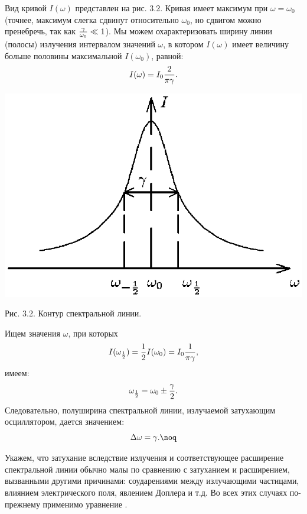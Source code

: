 Вид кривой $I(\omega)$ представлен на рис. 3.2. Кривая имеет
максимум при $\omega=\omega_0$ (точнее, максимум слегка сдвинут
относительно $\omega_0$, но сдвигом можно пренебречь, так как
${\gamma\over \omega_0}\ll 1$). Мы можем охарактеризовать ширину
линии (полосы) излучения интервалом значений $\omega$, в котором
$I(\omega)$ имеет величину больше половины максимальной
$I(\omega_0)$, равной: \vskip -2mm
$$I(\omega)=I_0{2\over\pi\gamma}.$$

\vskip 3mm
\centerline{\hbox{\includegraphics[scale=0.7]{Ris/ris_eps/ris3_02.eps}}}

\vskip -2mm
\leftskip 0cm\centerline{\ris Рис. 3.2. Контур спектральной
линии.} \vskip 2mm Ищем значения $\omega$, при которых
$$I(\omega_{1\over2})={1\over2}I(\omega_0)=I_0{1\over\pi\gamma},$$
имеем:
$$\omega_{1\over2}=\omega_0\pm{\gamma\over2}.$$
Следовательно, полуширина спектральной линии, излучаемой
затухающим осциллятором, дается значением:
$$\Delta \omega=\gamma.\noq$$

Укажем, что затухание вследствие излучения и соответствующее
расширение спектральной линии обычно малы по сравнению с
затуханием и расширением, вызванными другими причинами:
соударениями между излучающими частицами, влиянием электрического
поля, явлением Доплера и т.д. Во всех этих случаях по-прежнему
применимо уравнение .

